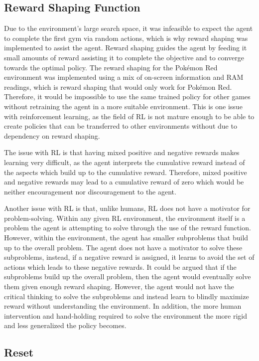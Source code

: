\subsection{Reward Shaping Function}

Due to the environment's large search space, it was infeasible to expect the agent to complete the first gym via random actions, which is why reward shaping was implemented to assist the agent. Reward shaping guides the agent by feeding it small amounts of reward assisting it to complete the objective and to converge towards the optimal policy. The reward shaping for the Pokémon Red environment was implemented using a mix of on-screen information and RAM readings, which is reward shaping that would only work for Pokémon Red. Therefore, it would be impossible to use the same trained policy for other games without retraining the agent in a more suitable environment. This is one issue with reinforcement learning, as the field of RL is not mature enough to be able to create policies that can be transferred to other environments without due to dependency on reward shaping.

The issue with RL is that having mixed positive and negative rewards makes learning very difficult, as the agent interprets the cumulative reward instead of the aspects which build up to the cumulative reward. Therefore, mixed positive and negative rewards may lead to a cumulative reward of zero which would be neither encouragement nor discouragement to the agent. 

Another issue with RL is that, unlike humans, RL does not have a motivator for problem-solving. Within any given RL environment, the environment itself is a problem the agent is attempting to solve through the use of the reward function. However, within the environment, the agent has smaller subproblems that build up to the overall problem. The agent does not have a motivator to solve these subproblems, instead, if a negative reward is assigned, it learns to avoid the set of actions which leads to these negative rewards. It could be argued that if the subproblems build up the overall problem, then the agent would eventually solve them given enough reward shaping. However, the agent would not have the critical thinking to solve the subproblems and instead learn to blindly maximize reward without understanding the environment. In addition, the more human intervention and hand-holding required to solve the environment the more rigid and less generalized the policy becomes.

\subsection{Reset}

